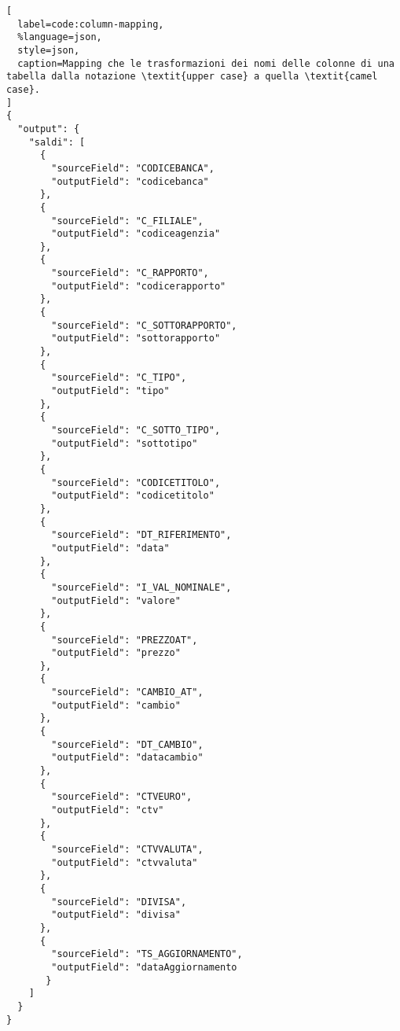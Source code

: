 \begin{lstlisting}[
  label=code:column-mapping,
  %language=json,
  style=json,
  caption=Mapping che le trasformazioni dei nomi delle colonne di una tabella dalla notazione \textit{upper case} a quella \textit{camel case}.
]
{
  "output": {
    "saldi": [
      {
        "sourceField": "CODICEBANCA",
        "outputField": "codicebanca"
      },
      {
        "sourceField": "C_FILIALE",
        "outputField": "codiceagenzia"
      },
      {
        "sourceField": "C_RAPPORTO",
        "outputField": "codicerapporto"
      },
      {
        "sourceField": "C_SOTTORAPPORTO",
        "outputField": "sottorapporto"
      },
      {
        "sourceField": "C_TIPO",
        "outputField": "tipo"
      },
      {
        "sourceField": "C_SOTTO_TIPO",
        "outputField": "sottotipo"
      },
      {
        "sourceField": "CODICETITOLO",
        "outputField": "codicetitolo"
      },
      {
        "sourceField": "DT_RIFERIMENTO",
        "outputField": "data"
      },
      {
        "sourceField": "I_VAL_NOMINALE",
        "outputField": "valore"
      },
      {
        "sourceField": "PREZZOAT",
        "outputField": "prezzo"
      },
      {
        "sourceField": "CAMBIO_AT",
        "outputField": "cambio"
      },
      {
        "sourceField": "DT_CAMBIO",
        "outputField": "datacambio"
      },
      {
        "sourceField": "CTVEURO",
        "outputField": "ctv"
      },
      {
        "sourceField": "CTVVALUTA",
        "outputField": "ctvvaluta"
      },
      {
        "sourceField": "DIVISA",
        "outputField": "divisa"
      },
      {
        "sourceField": "TS_AGGIORNAMENTO",
        "outputField": "dataAggiornamento
       }
    ]
  }
}
\end{lstlisting}